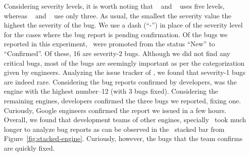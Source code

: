 \documentclass[10pt,conference,anonymous]{IEEEtran}
\begin{document}


Considering severity levels, it is worth noting that
\jsc{}~\cite{jsc-severity} and \smonkey{}~\cite{mozilla-severity} uses
five levels, whereas \chakra{}~\cite{chakra-severity} and
\veight{}~\cite{v8-severity} use only three. As usual, the smallest
the severity value the highest the severity of the bug. We use a dash
(``-'') in place of the severity level for the cases where the bug
report is pending confirmation. Of the \noBugsTransplantation{} bugs
we reported in this experiment, \noBugsTransplantationConfirmed\ were
promoted from the status ``New'' to ``Confirmed''. Of these, 16 are
severity-2 bugs.  Although we did not find any critical bugs, most of
the bugs are seemingly important as per the categorization given by
engineers. Analyzing the issue tracker of \chakra, we found that
severity-1 bugs are indeed rare. Considering the bug reports confirmed
by developers, \chakra{} was the engine with the highest number--12
(with 3 bugs fixed). Considering the remaining engines, \veight{}
developers confirmed the three bugs we reported, fixing
one. Curiously, Google engineers confirmed the report we issued in a
few hours. Overall, we found that development teams of other engines,
specially \jsc\, took much longer to analyze bug reports as can be
observed in the \jsc\ stacked bar from
Figure~\ref{fig:stacked-engine}. Curiously, however, the bugs that the
\jsc{} team confirms are quickly fixed.


\begin{center}
\end{center}
\end{document}
